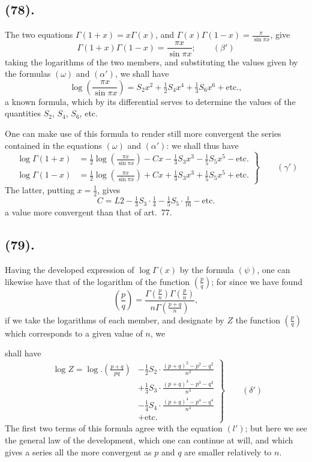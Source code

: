 \documentclass{article}
\begin{document}
\subsection*{(78).}

The two equations $\Gamma(1+x)=x\Gamma(x)$, and $\Gamma(x)\Gamma(1-x)=\frac{\pi}{\sin\pi x}$, give
\[ \Gamma(1+x)\Gamma(1-x)=\frac{\pi x}{\sin\pi x};\qquad(\beta') \]
taking the logarithms of the two members, and substituting the values given by the formulas $(\omega)$ and $(\alpha')$, we shall have
\[ \log\left(\frac{\pi x}{\sin\pi x}\right)=S_{2}x^{2}+\tfrac{1}{2}S_{4}x^{4}+\tfrac{1}{3}S_{6}x^{6}+\text{etc.}, \]
a known formula, which by its differential serves to determine the values of the quantities $S_{2}$, $S_{4}$, $S_{6}$, etc.

One can make use of this formula to render still more convergent the series contained in the equations $(\omega)$ and $(\alpha')$: we shall thus have
\[ \left.\begin{aligned} \log\Gamma(1+x)&=\tfrac{1}{2}\log\left(\frac{\pi x}{\sin\pi x}\right)-Cx-\tfrac{1}{3}S_{3}x^{3}-\tfrac{1}{5}S_{5}x^{5}-\text{etc.}\\ \log\Gamma(1-x)&=\tfrac{1}{2}\log\left(\frac{\pi x}{\sin\pi x}\right)+Cx+\tfrac{1}{3}S_{3}x^{3}+\tfrac{1}{5}S_{5}x^{5}+\text{etc.} \end{aligned}\right\}\qquad(\gamma') \]
The latter, putting $x=\frac{1}{2}$, gives
\[ C=L2-\tfrac{1}{3}S_{3}\cdot\tfrac{1}{4}-\tfrac{1}{5}S_{5}\cdot\tfrac{1}{16}-\text{etc.} \]
a value more convergent than that of art.\ 77.

\subsection*{(79).}

Having the developed expression of $\log\Gamma(x)$ by the formula $(\psi)$, one can likewise have that of the logarithm of the function $\left(\frac{p}{q}\right)$; for since we have found
\[ \left(\frac{p}{q}\right)=\frac{\Gamma\left(\frac{p}{n}\right)\Gamma\left(\frac{p}{n}\right)}{n\Gamma\left(\frac{p+q}{n}\right)}, \]
if we take the logarithms of each member, and designate by $Z$ the function $\left(\frac{p}{q}\right)$ which corresponds to a given value of $n$, we

shall have
\[ \left.\begin{aligned} \log Z=\log.\left(\frac{p+q}{pq}\right)&-\tfrac{1}{2}S_{2}\cdot\frac{(p+q)^{2}-p^{2}-q^{2}}{n^{2}}\\ &+\tfrac{1}{3}S_{3}\cdot\frac{(p+q)^{3}-p^{3}-q^{3}}{n^{3}}\\ &-\tfrac{1}{4}S_{4}\cdot\frac{(p+q)^{4}-p^{4}-q^{4}}{n^{4}}\\ &+\text{etc.} \end{aligned}\right\}\qquad(\delta') \]
The first two terms of this formula agree with the equation $(l')$; but here we see the general law of the development, which one can continue at will, and which gives a series all the more convergent as $p$ and $q$ are smaller relatively to $n$.
\end{document}
